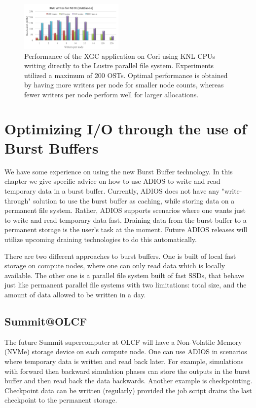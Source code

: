 \begin{figure}
\center
\includegraphics[width=0.45\textwidth]{figures/xgc_knl_cori.png}
\caption{Performance of the XGC application on Cori using KNL CPUs writing directly to the Lustre parallel file system. Experiments utilized a maximum of 200 OSTs. Optimal performance is obtained by having more writers per node for smaller node counts, whereas fewer writers per node perform well for larger allocations.}
\label{fig:XgcKnlCori}
\end{figure}

\section{Optimizing I/O through the use of Burst Buffers}
\label{chapter-bb}

We have some experience on using the new Burst Buffer technology. In this chapter we give specific advice on how to use ADIOS to write and read temporary data in a burst buffer. Currently, ADIOS does not have any "write-through" solution to use the burst buffer as caching, while storing data on a permanent file system. Rather, ADIOS supports scenarios where one wants just to write and read temporary data fast. Draining data from the burst buffer to a permanent storage is the user's task at the moment. Future ADIOS releases will utilize upcoming draining technologies to do this automatically. 

There are two different approaches to burst buffers. One is built of local fast storage on compute nodes, where one can only read data which is locally available. The other one is a parallel file system built of fast SSDs, that behave just like permanent parallel file systems with two limitations: total size, and the amount of data allowed to be written in a day. 

\subsection{Summit@OLCF}

The future Summit supercomputer at OLCF will have a Non-Volatile Memory (NVMe) storage device on each compute node. One can use ADIOS in scenarios where temporary data is written and read back later. For example, simulations with forward then backward simulation phases can store the outputs in the burst buffer and then read back the data backwards. Another example is checkpointing. Checkpoint data can be written (regularly) provided the job script drains the last checkpoint to the permanent storage. 

